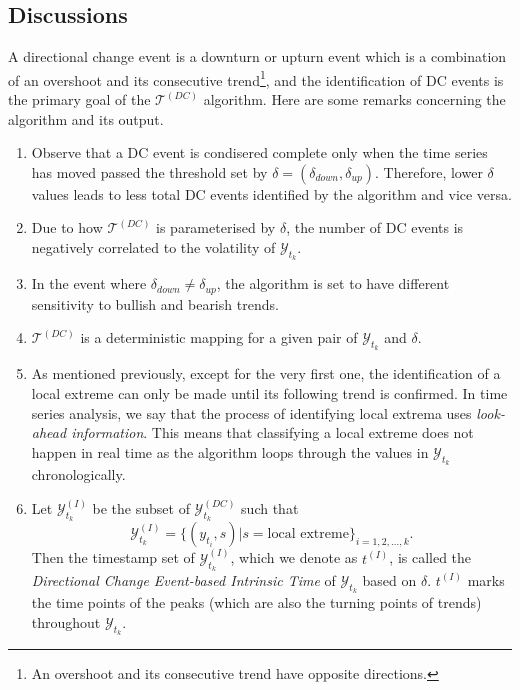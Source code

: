 \subsection{Discussions}\label{subsec: dc discussion}
A directional change event is a downturn or upturn event which is a combination of an overshoot and its consecutive trend\footnote{An overshoot and its consecutive trend have opposite directions.}, and the identification of DC events is the primary goal of the $\mathcal{T}^{(DC)}$ algorithm. Here are some remarks concerning the algorithm and its output.
\begin{enumerate}
    \item Observe that a DC event is condisered complete only when the time series has moved passed the threshold set by $\delta = (\delta_{down}, \delta_{up})$. Therefore, lower $\delta$ values leads to less total DC events identified by the algorithm and vice versa.
    \item Due to how $\mathcal{T}^{(DC)}$ is parameterised by $\delta$, the number of DC events is negatively correlated to the volatility of $\mathcal{Y}_{t_k}$.
    \item In the event where $\delta_{down} \neq \delta_{up}$, the algorithm is set to have different sensitivity to bullish and bearish trends.
    \item $\mathcal{T}^{(DC)}$ is a deterministic mapping for a given pair of $\mathcal{Y}_{t_k}$ and $\delta$.
    \item As mentioned previously, except for the very first one, the identification of a local extreme can only be made until its following trend is confirmed. In time series analysis, we say that the process of identifying local extrema uses \textit{look-ahead information}. This means that classifying a local extreme does not happen in real time as the algorithm loops through the values in $\mathcal{Y}_{t_k}$ chronologically.
    \item Let $\mathcal{Y}^{(I)}_{t_k}$ be the subset of $\mathcal{Y}^{(DC)}_{t_k}$ such that
    \begin{equation*}
        \mathcal{Y}^{(I)}_{t_k} = \{ (y_{t_i}, s) | s = \text{local extreme} \}_{i = 1, 2, \ldots, k}.
    \end{equation*}
    Then the timestamp set of $\mathcal{Y}^{(I)}_{t_k}$, which we denote as $t^{(I)}$, is called the \textit{Directional Change Event-based Intrinsic Time} of $\mathcal{Y}_{t_k}$ based on $\delta$. $t^{(I)}$ marks the time points of the peaks (which are also the turning points of trends) throughout $\mathcal{Y}_{t_k}$.
\end{enumerate}

